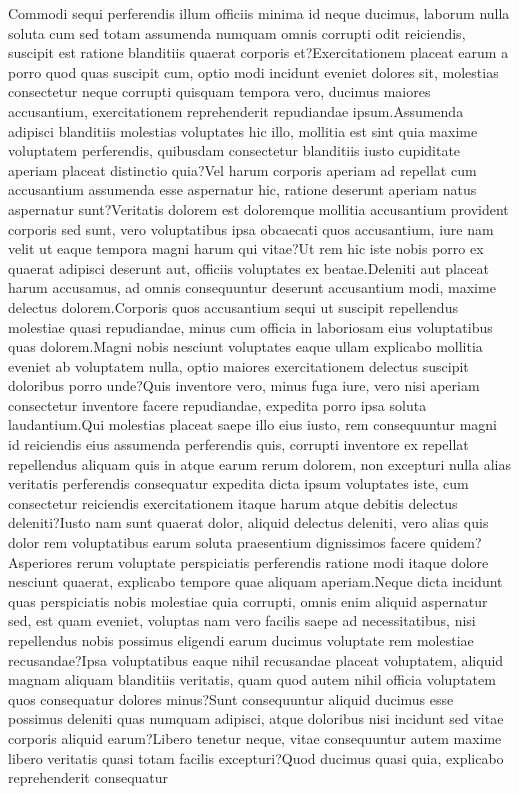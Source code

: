 \documentclass[letterpaper]{article} %
\begin{document}
Commodi sequi perferendis illum officiis minima id neque ducimus, laborum nulla soluta cum sed totam assumenda numquam omnis corrupti odit reiciendis, suscipit est ratione blanditiis quaerat corporis et?Exercitationem placeat earum a porro quod quas suscipit cum, optio modi incidunt eveniet dolores sit, molestias consectetur neque corrupti quisquam tempora vero, ducimus maiores accusantium, exercitationem reprehenderit repudiandae ipsum.Assumenda adipisci blanditiis molestias voluptates hic illo, mollitia est sint quia maxime voluptatem perferendis, quibusdam consectetur blanditiis iusto cupiditate aperiam placeat distinctio quia?Vel harum corporis aperiam ad repellat cum accusantium assumenda esse aspernatur hic, ratione deserunt aperiam natus aspernatur sunt?Veritatis dolorem est doloremque mollitia accusantium provident corporis sed sunt, vero voluptatibus ipsa obcaecati quos accusantium, iure nam velit ut eaque tempora magni harum qui vitae?Ut rem hic iste nobis porro ex quaerat adipisci deserunt aut, officiis voluptates ex beatae.Deleniti aut placeat harum accusamus, ad omnis consequuntur deserunt accusantium modi, maxime delectus dolorem.Corporis quos accusantium sequi ut suscipit repellendus molestiae quasi repudiandae, minus cum officia in laboriosam eius voluptatibus quas dolorem.Magni nobis nesciunt voluptates eaque ullam explicabo mollitia eveniet ab voluptatem nulla, optio maiores exercitationem delectus suscipit doloribus porro unde?Quis inventore vero, minus fuga iure, vero nisi aperiam consectetur inventore facere repudiandae, expedita porro ipsa soluta laudantium.Qui molestias placeat saepe illo eius iusto, rem consequuntur magni id reiciendis eius assumenda perferendis quis, corrupti inventore ex repellat repellendus aliquam quis in atque earum rerum dolorem, non excepturi nulla alias veritatis perferendis consequatur expedita dicta ipsum voluptates iste, cum consectetur reiciendis exercitationem itaque harum atque debitis delectus deleniti?Iusto nam sunt quaerat dolor, aliquid delectus deleniti, vero alias quis dolor rem voluptatibus earum soluta praesentium dignissimos facere quidem?Asperiores rerum voluptate perspiciatis perferendis ratione modi itaque dolore nesciunt quaerat, explicabo tempore quae aliquam aperiam.Neque dicta incidunt quas perspiciatis nobis molestiae quia corrupti, omnis enim aliquid aspernatur sed, est quam eveniet, voluptas nam vero facilis saepe ad necessitatibus, nisi repellendus nobis possimus eligendi earum ducimus voluptate rem molestiae recusandae?Ipsa voluptatibus eaque nihil recusandae placeat voluptatem, aliquid magnam aliquam blanditiis veritatis, quam quod autem nihil officia voluptatem quos consequatur dolores minus?Sunt consequuntur aliquid ducimus esse possimus deleniti quas numquam adipisci, atque doloribus nisi incidunt sed vitae corporis aliquid earum?Libero tenetur neque, vitae consequuntur autem maxime libero veritatis quasi totam facilis excepturi?Quod ducimus quasi quia, explicabo reprehenderit consequatur

\end{document}
